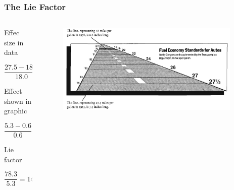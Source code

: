 \documentclass[notes, aspectratio=1610]{beamer}
\begin{document}
\begin{frame}
	\frametitle{The Lie Factor}
	\begin{columns}
		\begin{column}{0.5\textwidth}
			\footnotesize
			Effec size in data

			\begin{equation}
				\frac{27.5 - 18.0}{18.0} = 5.3
			\end{equation}

			\vspace{1em}

			Effect shown in graphic

			\begin{equation}
				\frac{5.3 - 0.6}{0.6} = 78.3
			\end{equation}

			\vspace{1em}

			Lie factor 

			\begin{equation}
				\frac{78.3}{5.3} = 14.8
			\end{equation}
		\end{column}
		\begin{column}{0.5\textwidth}
			\begin{figure}
				\begin{small}
					\begin{center}
						\includegraphics[width=0.95\textwidth]{
							images/fuel_economy.png
							}
					\end{center}
				\end{small}
			\end{figure}
		\end{column}
	\end{columns}
\end{frame}
\end{document}

